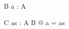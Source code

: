 \begin{zed}
	[A]
\end{zed}

\begin{schema}{B}
	a : A
\end{schema}

\begin{schema}{C}
	as : A
\where
	\exists B @ a = as
\end{schema}
